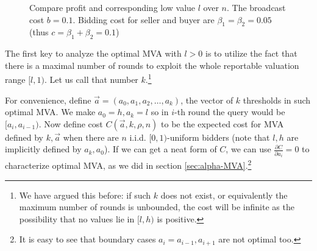 \begin{figure}
\centering
  \caption{Compare profit and corresponding low value $l$ over $n$. The
  broadcast cost $b = 0.1$. Bidding cost for seller and buyer are $\beta_1 =
  \beta_2 = 0.05$ (thus $c = \beta_1+\beta_2 = 0.1$)}\label{fig:general}
\end{figure}

The first key to analyze the optimal MVA with $l > 0$ is to utilize
the fact that there is a maximal number of rounds to exploit the whole
reportable valuation range $[l, 1)$. Let us call that
number $k$.\footnote{We have argued this before: if such $k$ does not exist, or equivalently
the maximum number of rounds is unbounded, the cost will be infinite as the possibility that no
values lie in $[l, h)$ is positive.}

For convenience, define $\vec a = (a_0, a_1, a_2, \ldots, a_k)$, the vector of
$k$ thresholds in such optimal MVA. We make $a_0 = h, a_k = l$ so in $i$-th
round the query would be $[a_i, a_{i-1})$. Now define cost $C(\vec a, k, \rho,
n)$ to be the expected cost for MVA defined by $k, \vec a$ when there are $n$
i.i.d.  $[0, 1)$-uniform bidders (note that $l, h$ are implicitly defined by
$a_k, a_0$). If we can get a neat form of $C$, we can use $\frac{\partial
C}{\partial a_i} = 0 $ to characterize optimal MVA, as we did in section
\ref{sec:alpha-MVA}.\footnote{It is easy to see that boundary cases $a_i = a_{i-1},
a_{i+1}$ are not optimal too.}

